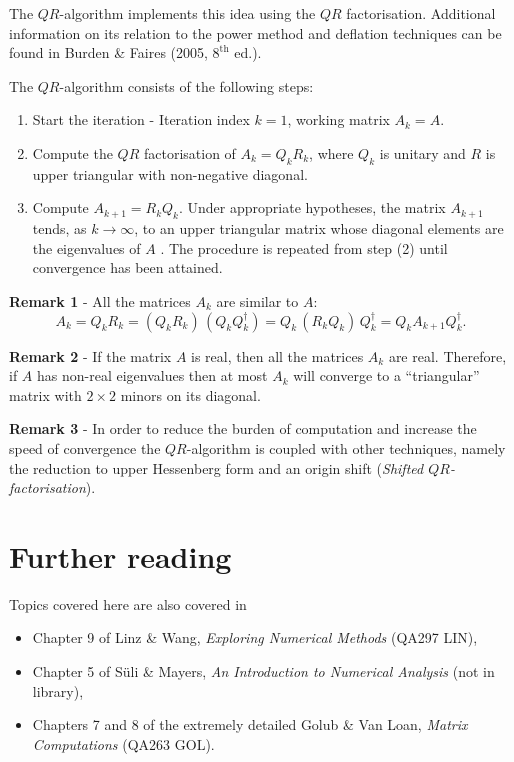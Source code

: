 The $QR$-algorithm implements this idea using the $QR$ factorisation.
Additional information on its relation to the power method and
deflation techniques can be found in Burden \& Faires (2005,
$8^{\textrm{th}}$ ed.).

The $QR$-algorithm consists of the following steps:

\begin{enumerate}
\item Start the iteration - Iteration index $k=1$, working matrix $A_k
  = A$.
\item Compute the $QR$ factorisation of $A_k = Q_k R_k$, where $Q_k$
  is unitary and $R$ is upper triangular with non-negative diagonal.
\item Compute $A_{k+1} = R_k Q_k$.  Under appropriate hypotheses, the
  matrix $A_{k+1}$ tends, as $k \to \infty$, to an upper triangular
  matrix whose diagonal elements are the eigenvalues of $A$ .  The
  procedure is repeated from step (2) until convergence has been
  attained.
\end{enumerate}

\noindent 
\textbf{Remark 1} - All the matrices $A_k$ are similar to $A$:
% 
\begin{equation*}
  A_k = Q_k R_k = (Q_k R_k) \, (Q_k Q_k^{\dagger}) = 
  Q_k \, ( R_k Q_k) \, Q_k^{\dagger} = 
  Q_k A_{k+1} Q_k^{\dagger} .
\end{equation*}

\noindent
\textbf{Remark 2} - If the matrix $A$ is real, then all the matrices
$A_k$ are real.  Therefore, if $A$ has non-real eigenvalues then at
most $A_k$ will converge to a ``triangular'' matrix with $2 \times 2$
minors on its diagonal.

\noindent
\textbf{Remark 3} - In order to reduce the burden of computation and
increase the speed of convergence the $QR$-algorithm is coupled with
other techniques, namely the reduction to upper Hessenberg form and an
origin shift (\textit{Shifted $QR$-factorisation}).

\section*{Further reading}

Topics covered here are also covered in
\begin{itemize}
\item Chapter 9 of Linz \& Wang, \textit{Exploring Numerical Methods}
  (QA297 LIN),
\item Chapter 5 of S{\"u}li \& Mayers, \textit{An Introduction to
    Numerical Analysis} (not in library),
\item Chapters 7 and 8 of the extremely detailed Golub \& Van Loan,
  \textit{Matrix Computations} (QA263 GOL).
\end{itemize}
